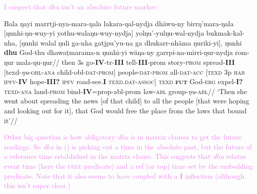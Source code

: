 \documentclass[11pt]{article}
\begin{document}
\begin{framed}
\textcolor{violet}{I suspect that \textit{dhu} isn't an absolute future marker:}

\pex \begingl \gla Bala ŋayi marrtji-nya-mara-ŋala lakara-ŋal-nydja dhäwu-ny birrŋ'mara-ŋala [ŋunhi-ŋu-wuy-yi yothu-walaŋu-wuy-nydja] yolŋu'-yulŋu-wal-nydja bukmak-kal-nha, [ŋunhi walal ŋuli ga-nha gatjpu'yu-na ga dhukarr-nhäma ŋuriki-yi], ŋunhi \textbf{dhu} God-thu dhawaṯmarama-n ŋunhi-yi wäŋa-ny garrpi-na-mirri-ŋur-nydja rom-ŋur mala-ŋu-ŋur//
\glb then 3s go-\textbf{IV}-\gls{tr}-\textbf{III} tell-\textbf{III}-\gls{prom} story-\textsc{prom} spread-\textbf{III} [\gls{texd}-\textit{ŋu}-\textsc{obl}-\textsc{ana} child-\gls{obl}-\textsc{dat}-\textsc{prom}] people-\textsc{dat-prom} all-\textsc{dat-acc} [\textsc{texd} 3p \textsc{hab} \textsc{ipfv}-\textbf{IV} hope-\textbf{III?} \textsc{ipfv} road-see.\textbf{I} \textsc{texd.dat-assoc}] \textsc{texd} \textsc{\textbf{fut}} God-\textsc{erg} expel-\textbf{I?} \textsc{texd-ana} land-\textsc{prom} bind-\textbf{IV}=\gls{prop}-\gls{abl}-\gls{prom} law-\textsc{abl} group-\textit{ŋu}-\textsc{abl}//
\glft`Then she went about spreading the news [of that child] to all the people [that were hoping and looking out for it], that God would free the place from the laws that bound it'//\endgl\xe

\textcolor{violet}{Other big question is how obligatory \textit{dhu} is in matrix clauses to get the future readings. So \textit{dhu} in (\lastx) is picking out a time in the absolute past, but the future of a reference time established in the matrix clause. This suggests that \textit{dhu} relates event time (here the \textsc{free} predicate) and a ref (or top) time set by the embedding predicate. Note that it also seems to have coupled with a \textbf{I} inflection (although this isn't super clear.)}
\end{framed}
\end{document}
